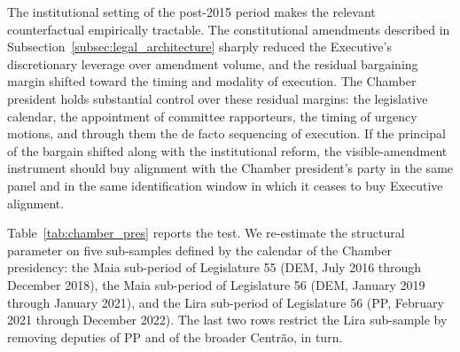 \documentclass[pdflatex,sn-basic]{sn-jnl}
\begin{document}
The institutional setting of the post-2015 period makes the relevant counterfactual empirically tractable. The constitutional amendments described in Subsection~\ref{subsec:legal_architecture} sharply reduced the Executive's discretionary leverage over amendment volume, and the residual bargaining margin shifted toward the timing and modality of execution. The Chamber president holds substantial control over these residual margins: the legislative calendar, the appointment of committee rapporteurs, the timing of urgency motions, and through them the de facto sequencing of execution. If the principal of the bargain shifted along with the institutional reform, the visible-amendment instrument should buy alignment with the Chamber president's party in the same panel and in the same identification window in which it ceases to buy Executive alignment.

Table~\ref{tab:chamber_pres} reports the test. We re-estimate the structural parameter on five sub-samples defined by the calendar of the Chamber presidency: the Maia sub-period of Legislature 55 (DEM, July 2016 through December 2018), the Maia sub-period of Legislature 56 (DEM, January 2019 through January 2021), and the Lira sub-period of Legislature 56 (PP, February 2021 through December 2022). The last two rows restrict the Lira sub-sample by removing deputies of PP and of the broader Centr\~ao, in turn.
\end{document}
